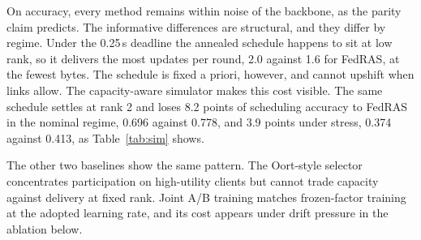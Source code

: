 \documentclass[preprint,12pt]{elsarticle}
\begin{document}
\begin{table}[H]
\centering
\caption{Scheduler simulation, 500 clients, 150 rounds, five seeds, final round. Accuracy is the bounded scheduling proxy (not dataset accuracy); bytes are per-round totals over admitted clients.}
\label{tab:sim}
\end{table}

On accuracy, every method remains within noise of the backbone, as the parity claim predicts. The informative differences are structural, and they differ by regime. Under the 0.25\,s deadline the annealed schedule happens to sit at low rank, so it delivers the most updates per round, 2.0 against 1.6 for FedRAS, at the fewest bytes. The schedule is fixed a priori, however, and cannot upshift when links allow. The capacity-aware simulator makes this cost visible. The same schedule settles at rank 2 and loses 8.2 points of scheduling accuracy to FedRAS in the nominal regime, 0.696 against 0.778, and 3.9 points under stress, 0.374 against 0.413, as Table~\ref{tab:sim} shows.

The other two baselines show the same pattern. The Oort-style selector concentrates participation on high-utility clients but cannot trade capacity against delivery at fixed rank. Joint A/B training matches frozen-factor training at the adopted learning rate, and its cost appears under drift pressure in the ablation below.
\end{document}
